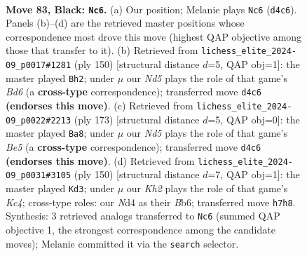 \documentclass[11pt]{article}
\begin{document}
\clearpage

\begin{figure}[p]\centering
\begin{subfigure}{0.46\textwidth}\centering
\resizebox{\linewidth}{!}{%
\newchessgame
\chessboard[
  setfen={8/7k/8/8/2bn1B2/7K/5P2/8 b - - 12 83},
  showmover=false,
  pgfstyle=straightmove, color=movearrow, markmove={d4-c6}
]}
\caption{}
\end{subfigure}\hfill
\begin{subfigure}{0.46\textwidth}\centering
\resizebox{\linewidth}{!}{%
\newchessgame
\chessboard[
  setfen={b2k4/8/3Bp3/8/8/4K3/8/8 w - - 47 76},
  showmover=false,
  pgfstyle=straightmove, color=movearrow, markmove={d6-h2}
]}
\caption{}
\end{subfigure}
\\[4pt]
\begin{subfigure}{0.46\textwidth}\centering
\resizebox{\linewidth}{!}{%
\newchessgame
\chessboard[
  setfen={8/8/1P6/8/1K2b3/6B1/1k6/8 b - - 2 87},
  showmover=false,
  pgfstyle=straightmove, color=movearrow, markmove={e4-a8}
]}
\caption{}
\end{subfigure}\hfill
\begin{subfigure}{0.46\textwidth}\centering
\resizebox{\linewidth}{!}{%
\newchessgame
\chessboard[
  setfen={8/8/1B6/4bk2/2K5/5p2/8/8 w - - 0 76},
  showmover=false,
  pgfstyle=straightmove, color=movearrow, markmove={c4-d3}
]}
\caption{}
\end{subfigure}
\caption{\textbf{Move 83, Black: \texttt{Nc6}.} (a) Our position; Melanie plays \texttt{Nc6} (\texttt{d4c6}). Panels (b)--(d) are the retrieved master positions whose correspondence most drove this move (highest QAP objective among those that transfer to it). (b) Retrieved from \texttt{lichess\_elite\_2024-09\_p0017\#1281} (ply 150) [structural distance $d$=5, QAP obj=1]: the master played \texttt{Bh2}; under $\mu$ our \emph{Nd5} plays the role of that game's \emph{Bd6} (a \textbf{cross-type} correspondence); transferred move \texttt{d4c6} \textbf{(endorses this move)}. (c) Retrieved from \texttt{lichess\_elite\_2024-09\_p0022\#2213} (ply 173) [structural distance $d$=5, QAP obj=0]: the master played \texttt{Ba8}; under $\mu$ our \emph{Nd5} plays the role of that game's \emph{Be5} (a \textbf{cross-type} correspondence); transferred move \texttt{d4c6} \textbf{(endorses this move)}. (d) Retrieved from \texttt{lichess\_elite\_2024-09\_p0031\#3105} (ply 150) [structural distance $d$=7, QAP obj=1]: the master played \texttt{Kd3}; under $\mu$ our \emph{Kh2} plays the role of that game's \emph{Kc4}; cross-type roles: our \emph{N}d4 as their \emph{B}b6; transferred move \texttt{h7h8}. Synthesis: 3 retrieved analogs transferred to \texttt{Nc6} (summed QAP objective 1, the strongest correspondence among the candidate moves); Melanie committed it via the \texttt{search} selector.}
\label{fig:thought-m165}
\end{figure}
\end{document}
